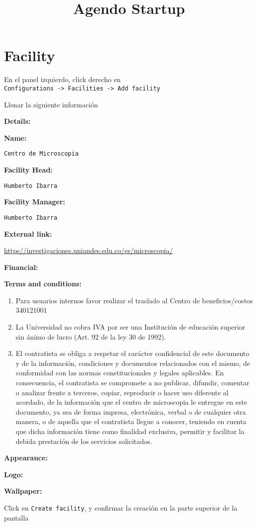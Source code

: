 \documentclass[11pt, letterpaper]{article}
\title{Agendo Startup}
\newcommand{\bitem}[1]{{\color{Maroon}\item\textbf{#1:}}}
\newcommand{\cmd}[1]{\texttt{#1}}
\begin{document}
	\maketitle
	\section{Facility}
	\begin{enumerate}
		\item En el panel izquierdo, click derecho en\\
		\cmd{Configurations -> Facilities -> Add facility}
		
		\item Llenar la siguiente informaci\'on
			
			\bitem{Financial}
			\begin{itemize}
				\bitem{Terms and conditions}
				\begin{enumerate}
					\item Para usuarios internos favor realizar el traslado al Centro de beneficios/costos 340121001
					
					\item La Universidad no cobra IVA por ser una Institución de educación superior sin ánimo de lucro (Art. 92 de la ley 30 de 1992).
					
					\item El contratista se obliga a respetar el carácter confidencial de este documento y de la información, condiciones y documentos relacionados con el mismo, de conformidad con las normas constitucionales y legales aplicables. En consecuencia, el contratista se compromete a no publicar, difundir, comentar o analizar frente a terceros, copiar, reproducir o hacer uso diferente al acordado, de la información que el centro de microscopia le entregue en este documento, ya sea de forma impresa, electrónica, verbal o de cualquier otra manera, o de aquella que el contratista llegue a conocer, teniendo en cuenta que dicha información tiene como finalidad exclusiva, permitir y facilitar la debida prestación de los servicios solicitados.
				\end{enumerate}
			\end{itemize}
			\bitem{Appearance}
			\begin{itemize}
				\bitem{Logo}
				\bitem{Wallpaper}
			\end{itemize}
		\end{itemize}
		
		\item Click en \cmd{Create facility}, y confirmar la creaci\'on en la parte superior de la pantalla
	\end{enumerate}
	
\end{document}
